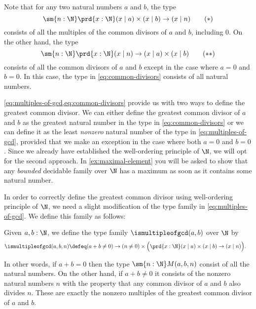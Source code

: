 Note that for any two natural numbers $a$ and $b$, the type
\begin{equation*}\label{eq:multiples-of-gcd}
  \sm{n:\N}\prd{x:\N} (x\mid a)\times (x\mid b)\to (x\mid n)\tag{\textasteriskcentered}
\end{equation*}
consists of all the multiples of the common divisors of $a$ and $b$, including $0$. On the other hand, the type
\begin{equation*}\label{eq:common-divisors}
  \sm{n:\N}\prd{x:\N} (x\mid n)\to (x\mid a)\times (x\mid b)\tag{\textasteriskcentered\textasteriskcentered}
\end{equation*}
consists of all the common divisors of $a$ and $b$ except in the case where $a=0$ and $b=0$. In this case, the type in \cref{eq:common-divisors} consists of all natural numbers.

\cref{eq:multiples-of-gcd,eq:common-divisors} provide us with two ways to define the greatest common divisor. We can either define the greatest common divisor of $a$ and $b$ as the greatest natural number in the type in \cref{eq:common-divisors} or we can define it as the least \emph{nonzero} natural number of the type in \cref{eq:multiples-of-gcd}, provided that we make an exception in the case where both $a=0$ and $b=0$. Since we already have established the well-ordering principle of $\N$, we will opt for the second approach. In \cref{ex:maximal-element} you will be asked to show that any \emph{bounded} decidable family over $\N$ has a maximum as soon as it contains some natural number. 

In order to correctly define the greatest common divisor using well-ordering principle of $\N$, we need a slight modification of the type family in \cref{eq:multiples-of-gcd}. We define this family as follows:

\begin{defn}\label{defn:fam-gcd}
  Given $a,b:\N$, we define the type family $\ismultipleofgcd(a,b)$ over $\N$ by
  \begin{align*}
    \ismultipleofgcd(a,b,n) & \defeq (a+b\neq 0) \to (n\neq 0)\times \Big(\prd{x:\N} (x\mid a)\times (x\mid b) \to (x\mid n)\Big).
  \end{align*}
\end{defn}

In other words, if $a+b=0$ then the type $\sm{n:\N}M(a,b,n)$ consist of all the natural numbers. On the other hand, if $a+b\neq 0$ it consists of the nonzero natural numbers $n$ with the property that any common divisor of $a$ and $b$ also divides $n$. These are exactly the nonzero multiples of the greatest common divisor of $a$ and $b$.

